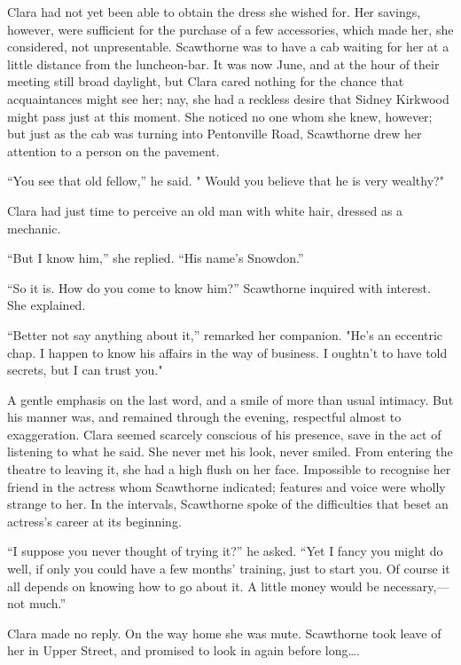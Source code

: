 Clara had not yet been able to obtain the dress she wished for. Her
savings, however, were sufficient for the purchase of a few accessories,
which made her, she considered, not {}unpresentable. Scawthorne was to
have a cab waiting for her at a little distance from the luncheon-bar.
It was now June, and at the hour of their meeting still broad daylight,
but Clara cared nothing for the chance that acquaintances might see her;
nay, she had a reckless desire that Sidney Kirkwood might pass just at
this moment. She noticed no one whom she knew, however; but just as the
cab was turning into Pentonville Road, Scawthorne drew her attention to
a person on the pavement.

``You see that old fellow,'' he said. " Would you believe that he is
very wealthy?"

Clara had just time to perceive an old man with white hair, dressed as a
mechanic.

``But I know him,'' she replied. ``His name's Snowdon.''

``So it is. How do you come to know him?'' Scawthorne inquired with
interest. She explained.

``Better not say anything about it,'' remarked her companion. "He's an
eccentric chap. I happen to know his affairs in the {}way of business. I
oughtn't to have told secrets, but I can trust you."

A gentle emphasis on the last word, and a smile of more than usual
intimacy. But his manner was, and remained through the evening,
respectful almost to exaggeration. Clara seemed scarcely conscious of
his presence, save in the act of listening to what he said. She never
met his look, never smiled. From entering the theatre to leaving it, she
had a high flush on her face. Impossible to recognise her friend in the
actress whom Scawthorne indicated; features and voice were wholly
strange to her. In the intervals, Scawthorne spoke of the difficulties
that beset an actress's career at its beginning.

``I suppose you never thought of trying it?'' he asked. ``Yet I fancy
you might do well, if only you could have a few months' training, just
to start you. Of course it all depends on knowing how to go about it. A
little money would be necessary,---not much.''

{}Clara made no reply. On the way home she was mute. Scawthorne took
leave of her in Upper Street, and promised to look in again before
long\ldots{}.

